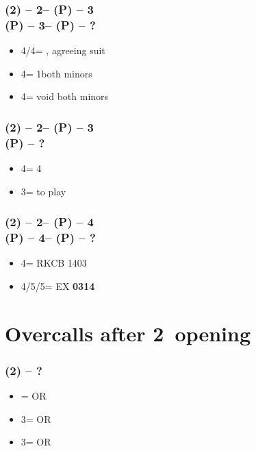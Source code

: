 \subsubsection*{(2\spades) -- 2\nt -- (P) -- 3\hearts \\
                (P) -- 3\spades -- (P) -- ?}
\begin{itemize}
    \item 4\clubs/4\diams = \nat, agreeing suit
    \item 4\hearts = 1\spades both minors
    \item 4\spades = void \spades both minors
\end{itemize}

\subsubsection*{(2\spades) -- 2\nt -- (P) -- 3\spades \\
                (P) -- ?}
\begin{itemize}
    \item 4\clubs = 4\hearts
    \item 3\nt = to play
\end{itemize}

\subsubsection*{(2\spades) -- 2\nt -- (P) -- 4\diams \\
                (P) -- 4\hearts -- (P) -- ?}
\begin{itemize}
    \item 4\nt = RKCB 1403
    \item 4\spades/5\clubs/5\diams = EX \textbf{0314}
\end{itemize}

\section{\texorpdfstring{Overcalls after 2\ntx\ opening}{ovecallsAfter2nt}}\label{sec:ovecallsAfter2nt}

\subsubsection*{(2\nt) -- ?}
\begin{itemize}
    \item \dbl = \twosuit{\clubs}{\spades} OR \twosuit{\diams}{\hearts}
    \item 3\clubs = \twosuit{\clubs}{\diams} OR \twosuit{\hearts}{\spades}
    \item 3\diams = \twosuit{\clubs}{\hearts} OR \twosuit{\diams}{\spades}
\end{itemize}

